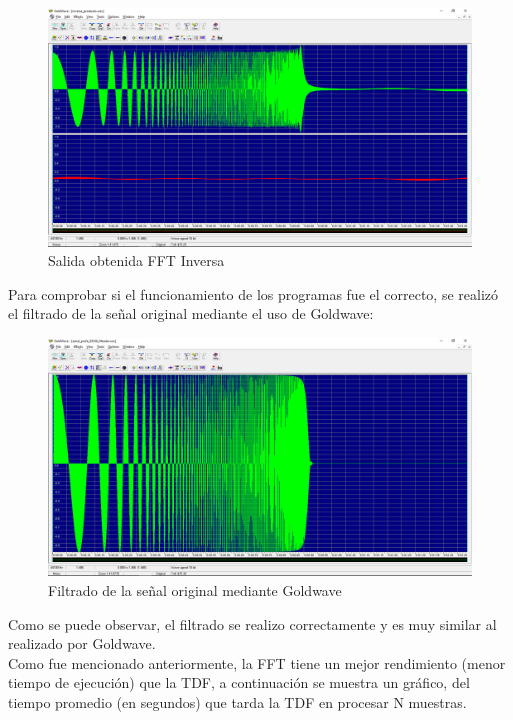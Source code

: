 \begin{figure}[H]
	\centering
	\includegraphics[scale=.35]{img/salida.png}
	\caption{Salida obtenida FFT Inversa}
	\label{fig:preba2s}		
\end{figure}
Para comprobar si el funcionamiento de los programas fue el correcto, se realizó el filtrado de la señal original mediante el uso de Goldwave:
\begin{figure}[H]
	\centering
	\includegraphics[scale=.35]{img/salida_goldwave.png}
	\caption{Filtrado de la señal original mediante Goldwave}
	\label{fig:preba2}		
\end{figure}
Como se puede observar, el filtrado se realizo correctamente y es muy similar al realizado por Goldwave.\\ Como fue mencionado anteriormente, la FFT tiene un mejor rendimiento (menor tiempo de ejecución) que la TDF, a continuación se muestra un gráfico, del tiempo promedio (en segundos) que tarda la TDF en procesar N muestras.
